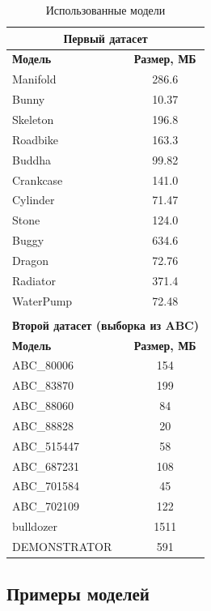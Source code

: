 \documentclass[a4paper,hidelinks,12pt]{article}
\begin{document}
\begin{table}[h!]
	\centering
	\begin{tabular}{|l|c|}
			\hline
			\multicolumn{2}{|c|}{\textbf{Первый датасет}} \\
			\hline
			\textbf{Модель} & \textbf{Размер, МБ} \\
			\hline
			Manifold     & 286.6 \\
			Bunny  & 10.37  \\
			Skeleton & 196.8 \\
			Roadbike & 163.3 \\
			Buddha     & 99.82 \\
			Crankcase & 141.0 \\
			Cylinder & 71.47 \\
			Stone & 124.0 \\
			Buggy & 634.6 \\
			Dragon & 72.76 \\
			Radiator & 371.4 \\
			WaterPump & 72.48 \\
			\hline
			\multicolumn{2}{c}{} \\[-1.5ex]
			\hline
			\multicolumn{2}{|c|}{\textbf{Второй датасет (выборка из ABC)}} \\
			\hline
			\textbf{Модель} & \textbf{Размер, МБ} \\
			\hline
			ABC\_80006 & 154 \\
			ABC\_83870 & 199 \\
			ABC\_88060 & 84 \\
			ABC\_88828 & 20 \\
			ABC\_515447 & 58 \\
			ABC\_687231 & 108 \\
			ABC\_701584 & 45 \\
			ABC\_702109 & 122 \\
			bulldozer & 1511 \\
			DEMONSTRATOR & 591 \\
			\hline
	\end{tabular}
	\caption{Использованные модели}
	\label{tab:dataset_sizes}
\end{table}

\newpage

\subsection{Примеры моделей}
\end{document}
